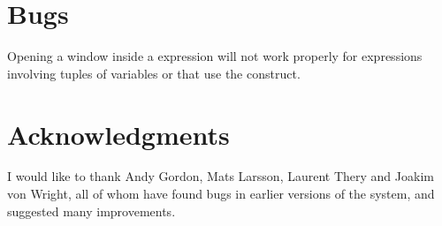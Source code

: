 \section{Bugs}

    Opening a window inside a  expression will not work properly
	for  expressions involving tuples of variables or
	that use the  construct.

\section*{Acknowledgments}
    I would like to thank Andy Gordon, Mats Larsson, Laurent Thery and
	Joakim von Wright, all of whom have found bugs in earlier versions of
	the system, and suggested many improvements.
